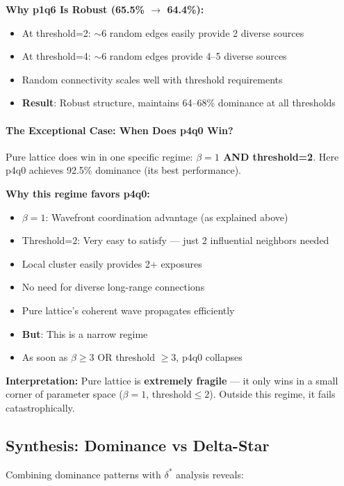 \documentclass[12pt,a4paper]{article}
\begin{document}
\textbf{Why p1q6 Is Robust (65.5\% $\to$ 64.4\%):}
\begin{itemize}
    \item At threshold=2: $\sim$6 random edges easily provide 2 diverse sources
    \item At threshold=4: $\sim$6 random edges provide 4--5 diverse sources
    \item Random connectivity scales well with threshold requirements
    \item \textbf{Result}: Robust structure, maintains 64--68\% dominance at all thresholds
\end{itemize}

\paragraph{The Exceptional Case: When Does p4q0 Win?}

Pure lattice does win in one specific regime: \textbf{$\beta=1$ AND threshold=2}. Here p4q0 achieves 92.5\% dominance (its best performance).

\textbf{Why this regime favors p4q0:}
\begin{itemize}
    \item $\beta=1$: Wavefront coordination advantage (as explained above)
    \item Threshold=2: Very easy to satisfy --- just 2 influential neighbors needed
    \item Local cluster easily provides 2+ exposures
    \item No need for diverse long-range connections
    \item Pure lattice's coherent wave propagates efficiently
    \item \textbf{But}: This is a narrow regime
    \item As soon as $\beta \geq 3$ OR threshold $\geq 3$, p4q0 collapses
\end{itemize}

\textbf{Interpretation:}
Pure lattice is \textbf{extremely fragile} --- it only wins in a small corner of parameter space ($\beta=1$, threshold$\leq 2$). Outside this regime, it fails catastrophically.

\subsection{Synthesis: Dominance vs Delta-Star}

Combining dominance patterns with $\delta^*$ analysis reveals:
\end{document}
